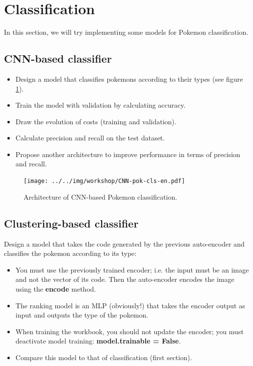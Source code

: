 \documentclass[11pt, a4paper]{article}
\begin{document}
\section{Classification}

In this section, we will try implementing some models for Pokemon classification.

\subsection{CNN-based classifier}

\begin{itemize}
	\item Design a model that classifies pokemons according to their types (see figure \ref{fig:CNN-pok-cls}).
	\item Train the model with validation by calculating accuracy.
	\item Draw the evolution of costs (training and validation).
	\item Calculate precision and recall on the test dataset.
	\item Propose another architecture to improve performance in terms of precision and recall.
\end{itemize}

\begin{figure}[htp]
	\centering
	\texttt{[image: ../../img/workshop/CNN-pok-cls-en.pdf]}
	\caption{Architecture of CNN-based Pokemon classification.}
	\label{fig:CNN-pok-cls}
\end{figure}

\subsection{Clustering-based classifier}

Design a model that takes the code generated by the previous auto-encoder and classifies the pokemon according to its type: 
\begin{itemize}
	\item You must use the previously trained encoder; i.e. the input must be an image and not the vector of its code. 
	Then the auto-encoder encodes the image using the \textbf{encode} method.
	\item The ranking model is an MLP (obviously!) that takes the encoder output as input and outputs the type of the pokemon.
	\item When training the workbook, you should not update the encoder; you must deactivate model training: \textbf{model.trainable = False}.
	\item Compare this model to that of classification (first section).
\end{itemize}
\end{document}
